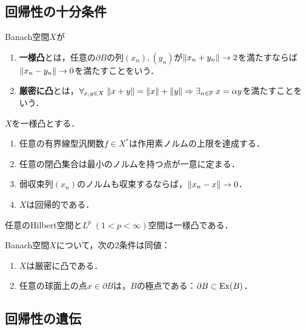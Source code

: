 \documentclass[uplatex,dvipdfmx]{jsreport}
\begin{document}
\subsection{回帰性の十分条件}

\begin{definition}
    Banach空間$X$が
    \begin{enumerate}
        \item \textbf{一様凸}とは，任意の$\partial B$の列$(x_n),(y_n)$が$\|x_n+y_n\|\to 2$を満たすならば$\|x_n-y_n\|\to0$を満たすことをいう．
        \item \textbf{厳密に凸}とは，$\forall_{x,y\in X}\;\|x+y\|=\|x\|+\|y\|\Rightarrow\exists_{\alpha\in\mathbb{F}}\; x =\alpha y$を満たすことをいう．
    \end{enumerate}
\end{definition}

\begin{proposition}
    $X$を一様凸とする．
    \begin{enumerate}
        \item 任意の有界線型汎関数$f\in X^*$は作用素ノルムの上限を達成する．
        \item 任意の閉凸集合は最小のノルムを持つ点が一意に定まる．
        \item 弱収束列$(x_n)$のノルムも収束するならば，$\|x_n-x\|\to0$．
        \item $X$は回帰的である．
    \end{enumerate}
\end{proposition}

\begin{example}
    任意のHilbert空間と$L^p\;(1<p<\infty)$空間は一様凸である．
\end{example}

\begin{proposition}
    Banach空間$X$について，次の2条件は同値：
    \begin{enumerate}
        \item $X$は厳密に凸である．
        \item 任意の球面上の点$x\in\partial B$は，$B$の極点である：$\partial B\subset\mathrm{Ex}(B)$．
    \end{enumerate}
\end{proposition}

\subsection{回帰性の遺伝}
\end{document}
